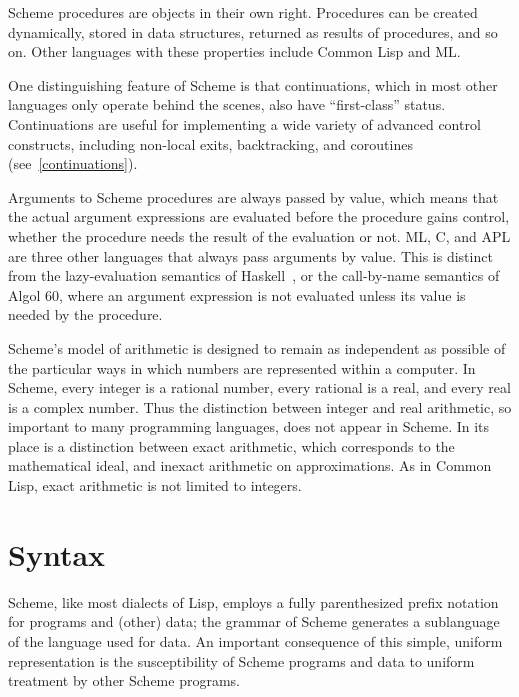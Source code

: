\vest Scheme procedures are objects in their own right.  Procedures can be
created dynamically, stored in data structures, returned as results of
procedures, and so on.  Other languages with these properties include
Common Lisp and ML. 

\vest One distinguishing feature of Scheme is that continuations, which
in most other languages only operate behind the scenes, also have
``first-class'' status.  Continuations are useful for implementing a
wide variety of advanced control constructs, including non-local exits,
backtracking, and coroutines (see~\ref{continuations}).

\vest Arguments to Scheme procedures are always passed by value, which
means that the actual argument expressions are evaluated before the
procedure gains control, whether the procedure needs the result of the
evaluation or not.  ML, C, and APL are three other languages that always
pass arguments by value.
This is distinct from the lazy-evaluation semantics of Haskell~\cite{Haskell},
or the call-by-name semantics of Algol 60, where an argument
expression is not evaluated unless its value is needed by the
procedure.


\vest Scheme's model of arithmetic is designed to remain as independent as
possible of the particular ways in which numbers are represented within a
computer.  In Scheme, every integer is a rational number, every rational is a
real, and every real is a complex number.  Thus the distinction between integer
and real arithmetic, so important to many programming languages, does not
appear in Scheme.  In its place is a distinction between exact arithmetic,
which corresponds to the mathematical ideal, and inexact arithmetic on
approximations.  As in Common Lisp, exact arithmetic is not limited to
integers.


\section{Syntax}

Scheme, like most dialects of Lisp, employs a fully parenthesized prefix
notation for programs and (other) data; the grammar of Scheme generates a
sublanguage of the language used for data.  An important
consequence of this simple, uniform representation is the susceptibility of
Scheme programs and data to uniform treatment by other Scheme programs.

